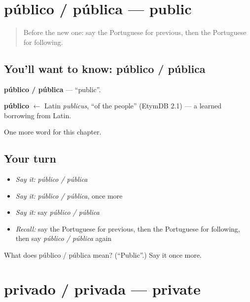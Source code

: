 \section[público / pública]{público / pública — public}

\label{lesson:PT-C156-publico-publica}



\begin{quote}
Before the new one: say the Portuguese for previous, then the Portuguese for following.
\end{quote}

\subsection*{You'll want to know: público / pública}
\textbf{público / pública} — \textquotedblleft{}public\textquotedblright{}.

\begin{cousinweb}
\textbf{público} $\leftarrow$ Latin \emph{publicus}, \textquotedblleft{}of the people\textquotedblright{} (EtymDB 2.1) — a learned borrowing from Latin.
\end{cousinweb}

\begin{grammarlens}[title={What you've built}]
One more word for this chapter.
\end{grammarlens}

\subsection*{Your turn}
\begin{itemize}
\raggedright
  \item \emph{Say it:} \emph{público / pública}
  \item \emph{Say it:} \emph{público / pública}, once more
  \item \emph{Say it:} say \emph{público / pública}
  \item \emph{Recall:} say the Portuguese for previous, then the Portuguese for following, then say \emph{público / pública} again
\end{itemize}

\begin{tcolorbox}[breakable,colback=teal!4,colframe=teal!35!black,title={Before you move on}]
What does público / pública mean? (\textquotedblleft{}Public\textquotedblright{}.) Say it once more.
\end{tcolorbox}
\section[privado / privada]{privado / privada — private}

